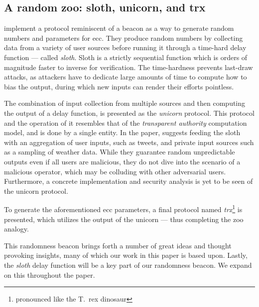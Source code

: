 \subsection{A random zoo: sloth, unicorn, and trx}%
\label{sub:random_zoo}
\citet{randomzoo} implement a protocol reminiscent of a beacon as a way to generate random numbers and parameters for \gls{ecc}.
They produce random numbers by collecting data from a variety of user sources before running it through a time-hard delay function --- called \textit{sloth}.
Sloth is a strictly sequential function which is orders of magnitude faster to inverse for verification.
The time-hardness prevents last-draw attacks, as attackers have to dedicate large amounts of time to compute how to bias the output, during which new inputs can render their efforts pointless.

The combination of input collection from multiple sources and then computing the output of a delay function, is presented as the \textit{unicorn} protocol.
This protocol and the operation of it resembles that of the \emph{transparent authority} computation model, and is done by a single entity.
In the paper, \citeauthor{randomzoo} suggests feeding the sloth with an aggregation of user inputs, such as tweets, and private input sources such as a sampling of weather data.
While they guarantee random unpredictable outputs even if all users are malicious, they do not dive into the scenario of a malicious operator, which may be colluding with other adversarial users.
Furthermore, a concrete implementation and security analysis is yet to be seen of the unicorn protocol.

To generate the aforementioned \gls{ecc} parameters, a final protocol named \textit{trx}\footnote{pronounced like the T.\ rex dinosaur} is presented, which utilizes the output of the unicorn --- thus completing the zoo analogy.

This randomness beacon brings forth a number of great ideas and thought provoking insights, many of which our work in this paper is based upon.
Lastly, the \emph{sloth} delay function will be a key part of our randomness beacon.
We expand on this throughout the paper.

